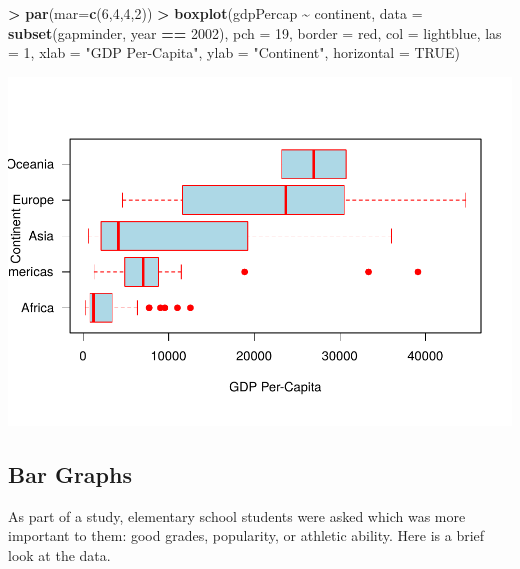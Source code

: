 \documentclass[
]{krantz}
\makeatletter
\newenvironment{Shaded}{\begin{snugshade}}{\end{snugshade}}
\newcommand{\DataTypeTok}[1]{\textcolor[rgb]{0.27,0.27,0.27}{#1}}
\newcommand{\DecValTok}[1]{\textcolor[rgb]{0.06,0.06,0.06}{#1}}
\newcommand{\KeywordTok}[1]{\textcolor[rgb]{0.27,0.27,0.27}{\textbf{#1}}}
\newcommand{\NormalTok}[1]{#1}
\newcommand{\OperatorTok}[1]{\textcolor[rgb]{0.43,0.43,0.43}{\textbf{#1}}}
\newcommand{\OtherTok}[1]{\textcolor[rgb]{0.37,0.37,0.37}{#1}}
\newcommand{\StringTok}[1]{\textcolor[rgb]{0.5,0.5,0.5}{#1}}
\newenvironment{kframe}{%
\medskip{}
\setlength{\fboxsep}{.8em}
 \def\at@end@of@kframe{}%
 \ifinner\ifhmode%
  \def\at@end@of@kframe{\end{minipage}}%
  \begin{minipage}{\columnwidth}%
 \fi\fi%
 \def\FrameCommand##1{\hskip\@totalleftmargin \hskip-\fboxsep
 \colorbox{shadecolor}{##1}\hskip-\fboxsep
     \hskip-\linewidth \hskip-\@totalleftmargin \hskip\columnwidth}%
 \MakeFramed {\advance\hsize-\width
   \@totalleftmargin\z@ \linewidth\hsize
   \@setminipage}}%
 {\par\unskip\endMakeFramed%
 \at@end@of@kframe}
\renewenvironment{Shaded}{\begin{kframe}}{\end{kframe}}
\makeatother
\begin{document}
\begin{Shaded}
\begin{Highlighting}[]
\OperatorTok{\textgreater{}}\StringTok{ }\KeywordTok{par}\NormalTok{(}\DataTypeTok{mar=}\KeywordTok{c}\NormalTok{(}\DecValTok{6}\NormalTok{,}\DecValTok{4}\NormalTok{,}\DecValTok{4}\NormalTok{,}\DecValTok{2}\NormalTok{))}
\OperatorTok{\textgreater{}}\StringTok{ }\KeywordTok{boxplot}\NormalTok{(gdpPercap }\OperatorTok{\textasciitilde{}}\StringTok{ }\NormalTok{continent, }\DataTypeTok{data =} \KeywordTok{subset}\NormalTok{(gapminder, year }\OperatorTok{==}\StringTok{ }\DecValTok{2002}\NormalTok{), }\DataTypeTok{pch =} \DecValTok{19}\NormalTok{, }\DataTypeTok{border =} \StringTok{\textquotesingle{}red\textquotesingle{}}\NormalTok{, }\DataTypeTok{col =} \StringTok{\textquotesingle{}lightblue\textquotesingle{}}\NormalTok{, }\DataTypeTok{las =} \DecValTok{1}\NormalTok{, }\DataTypeTok{xlab =} \StringTok{"GDP Per{-}Capita"}\NormalTok{, }\DataTypeTok{ylab =} \StringTok{"Continent"}\NormalTok{, }\DataTypeTok{horizontal =} \OtherTok{TRUE}\NormalTok{)}
\end{Highlighting}
\end{Shaded}

\includegraphics{bookdown_files/figure-latex/unnamed-chunk-356-1.pdf}

\hypertarget{bar-graphs-1}{%
\subsection{Bar Graphs}\label{bar-graphs-1}}

As part of a study, elementary school students were asked which was more important to them: good grades, popularity, or athletic ability. Here is a brief look at the data.
\end{document}
